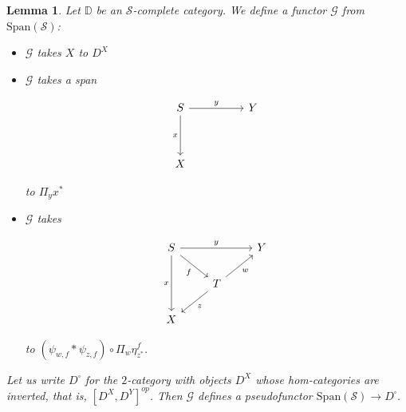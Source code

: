 \documentclass[10pt, oneside]{article}
\newtheorem{lemma}[theorem]{Lemma}
\begin{document}
\begin{lemma}\label{thm:span-pseudofunctorial-fundamental-lemma}
    Let $\mathbb{D}$ be an $\mathcal{S}$-complete category. We define a functor $\mathcal{G}$ from $\mathrm{Span}(\mathcal{S})$:

    \begin{itemize}
        \item $\mathcal{G}$ takes $X$ to $D^X$

        \item $\mathcal{G}$ takes a span

        \[\begin{tikzcd}[ampersand replacement=\&]
	S \&\& Y \\
	\\
	X
	\arrow["y", from=1-1, to=1-3]
	\arrow["x"', from=1-1, to=3-1]
        \end{tikzcd}\]

    \noindent to $\Pi_y x^\ast$

    \item $\mathcal{G}$ takes

    \[\begin{tikzcd}[ampersand replacement=\&]
	S \&\& Y \\
	\& T \\
	X
	\arrow["y", from=1-1, to=1-3]
	\arrow["x"', from=1-1, to=3-1]
	\arrow["z", from=2-2, to=3-1]
	\arrow["w"', from=2-2, to=1-3]
	\arrow["f"', from=1-1, to=2-2]
\end{tikzcd}\]

    \noindent to $(\psi_{w, f} \ast \psi_{z, f}) \circ \Pi_w \eta^f_{z^\ast}$.
    \end{itemize}

    Let us write $D^\square$ for the $2$-category with objects $D^X$ whose hom-categories are inverted, that is, $[D^X, D^Y]^{op}$. Then $\mathcal{G}$ defines a pseudofunctor $\mathrm{Span}{(\mathcal{S})} \to D^\square$.
\end{lemma}
\end{document}
